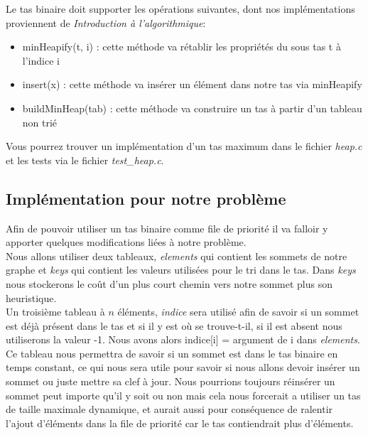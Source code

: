 \documentclass{article}
\begin{document}
Le tas binaire doit supporter les opérations suivantes, dont nos implémentations proviennent de 
\textit{Introduction à l'algorithmique}:
\begin{itemize}
	\item minHeapify(t, i) : cette méthode va rétablir les propriétés du sous tas t à l'indice i
	\item insert(x) : cette méthode va insérer un élément dans notre tas via minHeapify
	\item buildMinHeap(tab) : cette méthode va construire un tas à partir d'un tableau non trié\\
\end{itemize}

Vous pourrez trouver un implémentation d'un tas maximum dans le fichier \textit{heap.c} et 
les tests via le fichier \textit{test\_heap.c}.

\subsection{Implémentation pour notre problème}

Afin de pouvoir utiliser un tas binaire comme file de priorité il va falloir y apporter quelques
modifications liées à notre problème.\\

Nous allons utiliser deux tableaux, \textit{elements} qui contient les sommets de notre graphe
et \textit{keys} qui contient les valeurs utilisées pour le tri dans le tas. Dans \textit{keys} nous
stockerons le coût d'un plus court chemin vers notre sommet plus son heuristique.\\

Un troisième tableau à $n$ éléments, \textit{indice} sera utilisé afin de savoir si un sommet est
déjà présent dans le tas et si il y est où se trouve-t-il, si il est absent nous utiliserons la valeur -1.
Nous avons alors indice[i] = argument de i dans \textit{elements}.\\
Ce tableau nous permettra de savoir si un sommet est dans le tas binaire en temps constant,
ce qui nous sera utile pour savoir si nous allons devoir insérer un sommet ou juste 
mettre sa clef à jour. Nous pourrions toujours réinsérer un sommet peut importe qu'il y soit ou
non mais cela nous forcerait a utiliser un tas de taille maximale dynamique, et aurait aussi
pour conséquence de ralentir l'ajout d'éléments dans la file de priorité car le tas 
contiendrait plus d'éléments.\\
\end{document}
